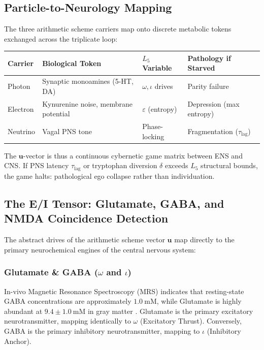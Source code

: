 \subsection{Particle-to-Neurology Mapping}

\begin{hypothesis}
The three arithmetic scheme carriers map onto discrete metabolic tokens exchanged across the triplicate loop:

\begin{center}
\begin{tabular}{@{}llll@{}}
\toprule
\textbf{Carrier} & \textbf{Biological Token} & \textbf{$L_5$ Variable} & \textbf{Pathology if Starved} \\
\midrule
Photon   & Synaptic monoamines (5-HT, DA) & $\omega, \iota$ drives & Parity failure \\
Electron & Kynurenine noise, membrane potential & $\varepsilon$ (entropy) & Depression (max entropy) \\
Neutrino & Vagal PNS tone & Phase-locking & Fragmentation ($\tau_{\text{lag}}$) \\
\bottomrule
\end{tabular}
\end{center}

The $\mathbf{u}$-vector is thus a continuous cybernetic game matrix between ENS and CNS. If PNS latency $\tau_{\text{lag}}$ or tryptophan diversion $\delta$ exceeds $L_5$ structural bounds, the game halts: pathological ego collapse rather than individuation.
\end{hypothesis}

\subsection{The E/I Tensor: Glutamate, GABA, and NMDA Coincidence Detection}

The abstract drives of the arithmetic scheme vector $\mathbf{u}$ map directly to the primary neurochemical engines of the central nervous system:

\subsubsection{Glutamate \& GABA (\texorpdfstring{$\omega$ and $\iota$}{\omega and \iota})}
In-vivo Magnetic Resonance Spectroscopy (MRS) indicates that resting-state GABA concentrations are approximately $1.0\:\mathrm{mM}$, while Glutamate is highly abundant at $9.4 \pm 1.0\:\mathrm{mM}$ in gray matter \cite{mrs_glutamate}. Glutamate is the primary excitatory neurotransmitter, mapping identically to $\omega$ (Excitatory Thrust). Conversely, GABA is the primary inhibitory neurotransmitter, mapping to $\iota$ (Inhibitory Anchor). 

